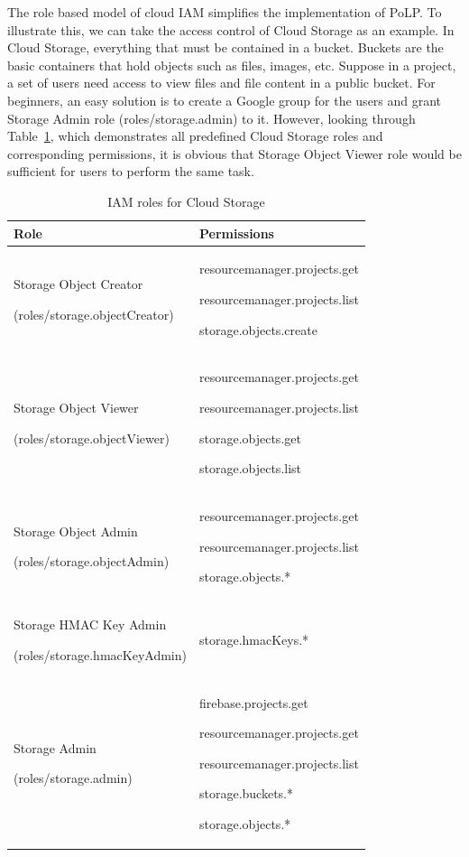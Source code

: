 The role based model of cloud IAM simplifies the implementation of PoLP. To illustrate this, we can take the access control of Cloud Storage as an example. In Cloud Storage, everything that must be contained in a bucket. Buckets are the basic containers that hold objects such as files, images, etc. Suppose in a project, a set of users need access to view files and file content in a public bucket. For beginners, an easy solution is to create a Google group for the users and grant Storage Admin role (roles/storage.admin) to it. However, looking through Table~\ref{table:sto-role}, which demonstrates all predefined Cloud Storage roles and corresponding permissions, it is obvious that Storage Object Viewer role would be sufficient for users to perform the same task. 
\begin{table}[t]
    \caption{IAM roles for Cloud Storage} \centering
    \begin{tabular}{|p{4.2cm}|p{4cm}|}
    \hline
    Role & Permissions\\
    \hline
    \hline
    Storage Object Creator\par(roles/storage.objectCreator) &  resourcemanager.projects.get \par resourcemanager.projects.list \par storage.objects.create \\ %
    \hline
    Storage Object Viewer\par(roles/storage.objectViewer) & resourcemanager.projects.get\par resourcemanager.projects.list\par storage.objects.get\par storage.objects.list \\ %
    \hline
    Storage Object Admin\par(roles/storage.objectAdmin) & resourcemanager.projects.get \par resourcemanager.projects.list\par storage.objects.*\\ %
    \hline
    Storage HMAC Key Admin\par(roles/storage.hmacKeyAdmin) &storage.hmacKeys.*\\
    \hline
     Storage Admin\par(roles/storage.admin) &firebase.projects.get\par resourcemanager.projects.get\par resourcemanager.projects.list\par storage.buckets.*\par storage.objects.*\\
    \hline
    \end{tabular}
    \label{table:sto-role}
\end{table}
